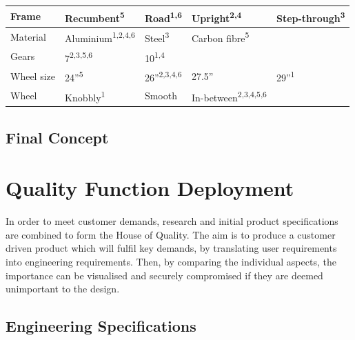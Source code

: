 \documentclass[a4paper,11pt]{article}
\begin{document}
\begin{table}[!ht]
\begin{tabular}{l l l l l}
		Frame&Recumbent\textsuperscript{5}&Road\textsuperscript{1,6}&Upright\textsuperscript{2,4}&Step-through\textsuperscript{3}\\\hline
		Material&Aluminium\textsuperscript{1,2,4,6}&Steel\textsuperscript{3}&Carbon fibre\textsuperscript{5}&\\\hline
		Gears&7\textsuperscript{2,3,5,6}&10\textsuperscript{1,4}&&\\\hline
		Wheel size&24''\textsuperscript{5}&26''\textsuperscript{2,3,4,6}&27.5''&29''\textsuperscript{1}\\\hline
		Wheel&Knobbly\textsuperscript{1}&Smooth&In-between\textsuperscript{2,3,4,5,6}&\\
	\end{tabular}
\end{table}

\subsection{Final Concept}

\newpage
\section{Quality Function Deployment}

In order to meet customer demands, research and initial product specifications are combined to form the House of Quality. The aim is to produce a customer driven product which will fulfil key demands, by translating user requirements into engineering requirements. Then, by comparing the individual aspects, the importance can be visualised and securely compromised if they are deemed unimportant to the design.

\subsection{Engineering Specifications}
\end{document}
